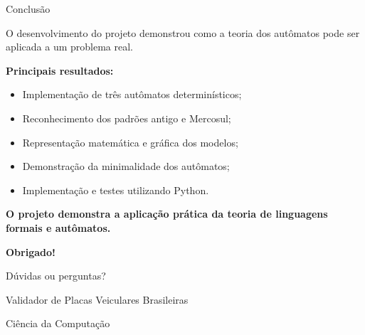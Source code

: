\documentclass[aspectratio=169,12pt]{beamer}
\begin{document}
\begin{frame}{Conclusão}

    O desenvolvimento do projeto demonstrou como a teoria
    dos autômatos pode ser aplicada a um problema real.

    \vspace{0.3cm}

    \textbf{Principais resultados:}

    \begin{itemize}
        \item Implementação de três autômatos determinísticos;
        \item Reconhecimento dos padrões antigo e Mercosul;
        \item Representação matemática e gráfica dos modelos;
        \item Demonstração da minimalidade dos autômatos;
        \item Implementação e testes utilizando Python.
    \end{itemize}

    \vspace{0.4cm}

    \begin{center}
        \Large
        \textbf{O projeto demonstra a aplicação prática
        da teoria de linguagens formais e autômatos.}
    \end{center}

\end{frame}


\begin{frame}
    \begin{center}

        \Huge
        \textbf{Obrigado!}

        \vspace{0.7cm}

        \Large
        Dúvidas ou perguntas?

        \vspace{0.8cm}

        \normalsize
        Validador de Placas Veiculares Brasileiras

        \vspace{0.3cm}

        Ciência da Computação

    \end{center}
\end{frame}
\end{document}
